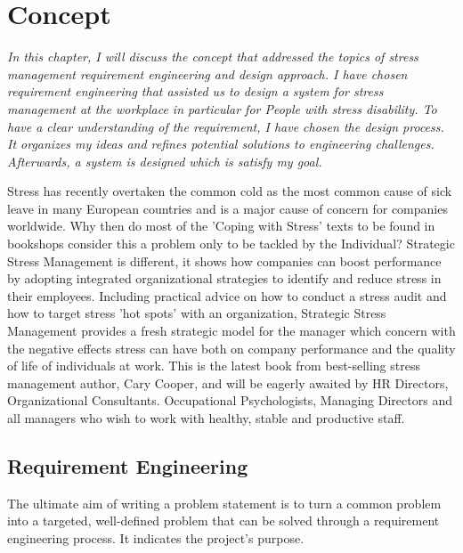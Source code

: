 \chapter{Concept}
\textit{In this chapter, I will discuss the concept that addressed the topics  of  stress management requirement engineering and design approach. I have  chosen requirement engineering that  assisted  us  to design a system for stress management at  the  workplace  in  particular  for People with stress disability. To have  a clear understanding of the requirement, I have chosen the design process. It organizes my ideas and refines potential solutions to engineering challenges. Afterwards, a  system is designed which is satisfy my goal.}
\vspace{5mm}

Stress has recently overtaken the common cold as the most common cause of sick leave in many European countries and is a major cause of concern for companies worldwide. Why then do most of the 'Coping with Stress' texts to be found in bookshops consider this a problem only to be tackled by the Individual? Strategic Stress Management is different, it shows how companies can boost performance by adopting integrated organizational strategies to identify and reduce stress in their employees. Including practical advice on how to conduct a stress audit and how to target stress 'hot spots' with an organization, Strategic Stress Management provides a fresh strategic model for the manager which concern with the negative effects stress can have both on company performance and the quality of life of individuals at work. This is the latest book from best-selling stress management author, Cary Cooper, and will be eagerly awaited by HR Directors, Organizational Consultants. Occupational Psychologists, Managing Directors and all managers who wish to work with healthy, stable and productive staff.

\section{Requirement Engineering}
The ultimate aim of writing a problem statement is to turn a common problem into a targeted, well-defined problem that can be solved through a requirement engineering process. It indicates the project's purpose. \citep{K.AduMichael2014InadequateStudy.}

\begin{figure}[ht!]
\centering
{}
  \label{fig:RE}
\end{figure}

